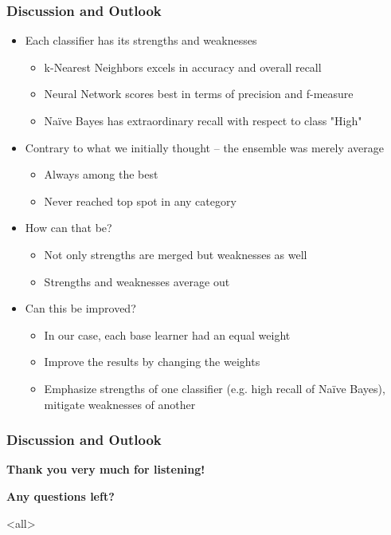 \mode*
\begin{frame}
  \frametitle{Discussion and Outlook}
  \onslide<+->
  \begin{itemize}
    \item<+-> Each classifier has its strengths and weaknesses
      \begin{itemize}
        \item<+-> k-Nearest Neighbors excels in accuracy and overall recall
        \item<+-> Neural Network scores best in terms of precision and f-measure
        \item<+-> Na\"ive Bayes has extraordinary recall with respect to class "High"
      \end{itemize}
    \item<+-> Contrary to what we initially thought -- the ensemble was merely average
      \begin{itemize}
        \item<+-> Always among the best
        \item<+-> Never reached top spot in any category
      \end{itemize}
        		\item<+-> How can that be?
		\begin{itemize}
			\item<+-> Not only strengths are merged but weaknesses as well
			\item<+-> Strengths and weaknesses average out
		\end{itemize}
		\item<+-> Can this be improved?
		\begin{itemize}
			\item<+-> In our case, each base learner had an equal weight
			\item<+-> Improve the results by changing the weights
			\item<+-> Emphasize strengths of one classifier (e.g. high recall
			of Na\"ive Bayes), mitigate weaknesses of another
		\end{itemize}
	\end{itemize}
\end{frame}

\begin{frame}[c]
  \frametitle{Discussion and Outlook}
  \center
  \textbf{Thank you very much for listening!}
  
  \textbf{Any questions left?}
\end{frame}
\mode<all>
